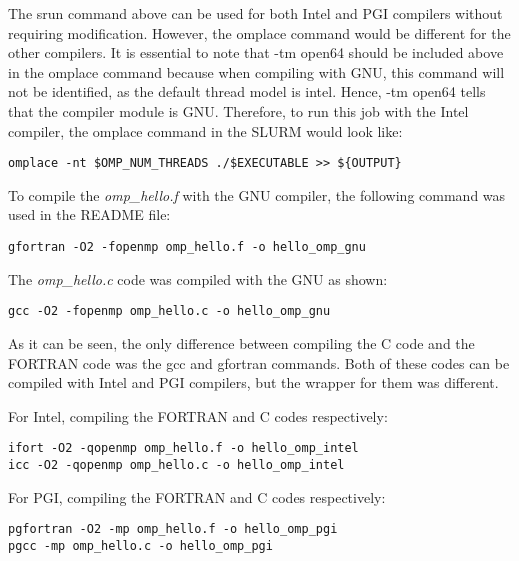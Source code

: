 The srun command above can be used for both Intel and PGI compilers without requiring modification. However, the omplace command would be different for
the other compilers. It is essential to note that -tm open64 should be included above in the omplace command because when compiling with GNU, this 
command will not be identified, as the default thread model is intel. Hence, -tm open64 tells that the compiler module is GNU. Therefore, to run this job
with the Intel compiler, the omplace command in the SLURM would look like:

\begin{tcolorbox}
\begin{Verbatim}[fontsize=\scriptsize]
omplace -nt $OMP_NUM_THREADS ./$EXECUTABLE >> ${OUTPUT}
\end{Verbatim}
\end{tcolorbox}

To compile the \emph{omp\_hello.f} with the GNU compiler, the following command was used in the README file:

\begin{tcolorbox}
\begin{Verbatim}[fontsize=\scriptsize]
gfortran -O2 -fopenmp omp_hello.f -o hello_omp_gnu
\end{Verbatim}
\end{tcolorbox}

The \emph{omp\_hello.c} code was compiled with the GNU as shown:

\begin{tcolorbox}
\begin{Verbatim}[fontsize=\scriptsize]
gcc -O2 -fopenmp omp_hello.c -o hello_omp_gnu
\end{Verbatim}
\end{tcolorbox}

As it can be seen, the only difference between compiling the C code and the FORTRAN code was the gcc and gfortran commands. Both of these codes can be 
compiled with Intel and PGI compilers, but the wrapper for them was different.

For Intel, compiling the FORTRAN and C codes respectively:

\begin{tcolorbox}
\begin{Verbatim}[fontsize=\scriptsize]
ifort -O2 -qopenmp omp_hello.f -o hello_omp_intel
icc -O2 -qopenmp omp_hello.c -o hello_omp_intel
\end{Verbatim}
\end{tcolorbox}

For PGI, compiling the FORTRAN and C codes respectively:

\begin{tcolorbox}
\begin{Verbatim}[fontsize=\scriptsize]
pgfortran -O2 -mp omp_hello.f -o hello_omp_pgi
pgcc -mp omp_hello.c -o hello_omp_pgi
\end{Verbatim}
\end{tcolorbox}
